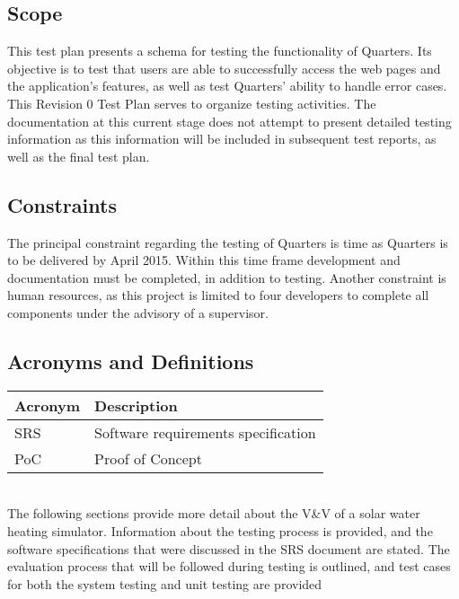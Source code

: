 \documentclass[12pt]{article}
\begin{document}
\subsection{Scope} 
This test plan presents a schema for testing the functionality of Quarters. Its objective is to test that users are able to successfully access the web pages and the application's features, as well as test Quarters' ability to handle error cases. \\

\noindent This Revision 0 Test Plan serves to organize testing activities. The documentation at this current stage does not attempt to present detailed testing information as this information will be included in subsequent test reports, as well as the final test plan.


\subsection{Constraints}
The principal constraint regarding the testing of Quarters is time as Quarters is to be delivered by April 2015. Within this time frame development and documentation must be completed, in addition to testing. Another constraint is human resources, as this project is limited to four developers to complete all components under the advisory of a supervisor.

\subsection{Acronyms and Definitions}

\renewcommand{\arraystretch}{1.2}
\begin{tabular}{l l} 
  \toprule		
  \textbf{Acronym} & \textbf{Description}\\
  \midrule 
  SRS		&Software requirements specification\\
  PoC		&Proof of Concept\\
  \bottomrule
\end{tabular}\\


The following sections provide more detail about the V\&V of a solar water heating
 simulator. Information about the testing process is provided, and the software specifications
that were discussed in the SRS document are stated.  The evaluation process that will be followed during 
testing is outlined, and test cases for both the system testing and unit testing are provided 
\end{document}
